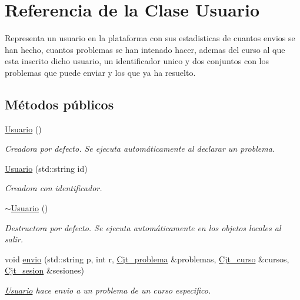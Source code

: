 \hypertarget{class_usuario}{}\section{Referencia de la Clase Usuario}
\label{class_usuario}


Representa un usuario en la plataforma con sus estadisticas de cuantos envios se han hecho, cuantos problemas se han intenado hacer, ademas del curso al que esta inscrito dicho usuario, un identificador unico y dos conjuntos con los problemas que puede enviar y los que ya ha resuelto.  


\subsection*{Métodos públicos}
\begin{DoxyCompactItemize}
\item 
\mbox{\hyperlink{class_usuario_aa85a5371a098dfba5449140d9b8a472f}{Usuario}} ()
\begin{DoxyCompactList}\small\item\em Creadora por defecto. Se ejecuta automáticamente al declarar un problema. \end{DoxyCompactList}\item 
\mbox{\hyperlink{class_usuario_adbc2bd125ed21ba9e091e3593e31f4cd}{Usuario}} (std\+::string id)
\begin{DoxyCompactList}\small\item\em Creadora con identificador. \end{DoxyCompactList}\item 
\mbox{\hyperlink{class_usuario_ab4096b0b8300ecb47b10c555fb09c997}{$\sim$\+Usuario}} ()
\begin{DoxyCompactList}\small\item\em Destructora por defecto. Se ejecuta automáticamente en los objetos locales al salir. \end{DoxyCompactList}\item 
void \mbox{\hyperlink{class_usuario_a2baa098a110a9041c66bf76635d4153b}{envio}} (std\+::string p, int r, \mbox{\hyperlink{class_cjt__problema}{Cjt\+\_\+problema}} \&problemas, \mbox{\hyperlink{class_cjt__curso}{Cjt\+\_\+curso}} \&cursos, \mbox{\hyperlink{class_cjt__sesion}{Cjt\+\_\+sesion}} \&sesiones)
\begin{DoxyCompactList}\small\item\em \mbox{\hyperlink{class_usuario}{Usuario}} hace envio a un problema de un curso especifico. \end{DoxyCompactList}\item 

\end{DoxyCompactItemize}
